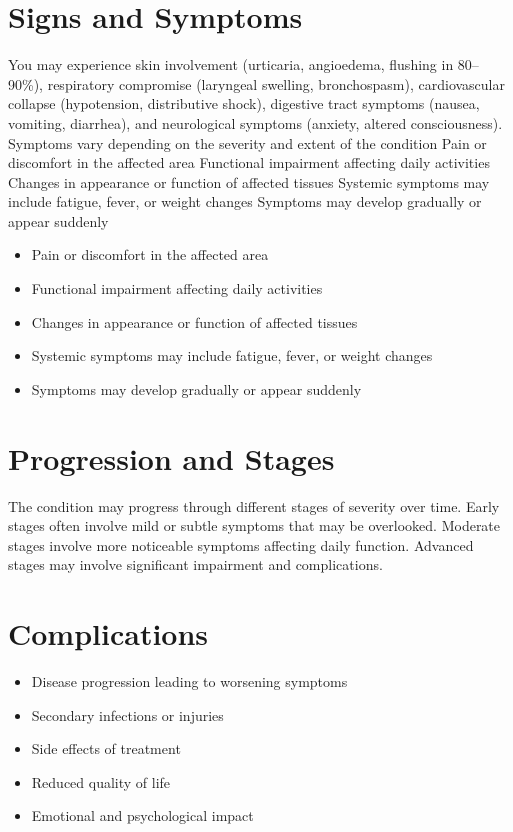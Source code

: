 \section{Signs and Symptoms}
You may experience skin involvement (urticaria, angioedema, flushing in 80--90\%), respiratory compromise (laryngeal swelling, bronchospasm), cardiovascular collapse (hypotension, distributive shock), digestive tract symptoms (nausea, vomiting, diarrhea), and neurological symptoms (anxiety, altered consciousness). Symptoms vary depending on the severity and extent of the condition Pain or discomfort in the affected area Functional impairment affecting daily activities Changes in appearance or function of affected tissues Systemic symptoms may include fatigue, fever, or weight changes Symptoms may develop gradually or appear suddenly

\begin{itemize}[noitemsep]
  \item Pain or discomfort in the affected area
  \item Functional impairment affecting daily activities
  \item Changes in appearance or function of affected tissues
  \item Systemic symptoms may include fatigue, fever, or weight changes
  \item Symptoms may develop gradually or appear suddenly
\end{itemize}
\section{Progression and Stages}
The condition may progress through different stages of severity over time. Early stages often involve mild or subtle symptoms that may be overlooked. Moderate stages involve more noticeable symptoms affecting daily function. Advanced stages may involve significant impairment and complications.
\section{Complications}
\begin{itemize}[noitemsep]
  \item Disease progression leading to worsening symptoms
  \item Secondary infections or injuries
  \item Side effects of treatment
  \item Reduced quality of life
  \item Emotional and psychological impact
\end{itemize}
